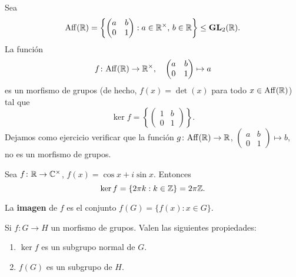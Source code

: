 

\begin{example}
\label{exa:afin}
Sea 
\[
\mathrm{Aff}(\mathbb{R})=\left\{\begin{pmatrix}a&b\\0&1\end{pmatrix}:a\in\mathbb{R}^\times,\,b\in\mathbb{R}\right\}\leq\mathbf{GL}_2(\mathbb{R}).
\]
La función 
\[
f\colon \mathrm{Aff}(\mathbb{R})\to\mathbb{R}^\times,\quad
\begin{pmatrix}
a&b\\
0&1
\end{pmatrix}
\mapsto a
\]
es un morfismo de grupos (de hecho, $f(x)=\det(x)$ para todo $x\in\mathrm{Aff}(\mathbb{R})$) tal que
\[
\ker f=\left\{\begin{pmatrix}
1&b\\
0&1
\end{pmatrix}
\right\}.
\]
Dejamos como ejercicio verificar que la función $g\colon\mathrm{Aff}(\mathbb{R})\to\mathbb{R}$, $\begin{pmatrix}a&b\\0&1\end{pmatrix}\mapsto b$, 
no es un morfismo de grupos. 
\end{example}

\begin{example}
Sea $f\colon\mathbb{R}\to\mathbb{C}^\times$, $f(x)=\cos x+i\sin x$. Entonces
\[
\ker f=\{2\pi k:k\in\mathbb{Z}\}=2\pi\mathbb{Z}.
\] 
\end{example}

\begin{definition}
La \textbf{imagen} de $f$ es 
el conjunto $f(G)=\{f(x):x\in G\}$. 
\end{definition}

\begin{proposition}
	Si  $f\colon G\to H$ un morfismo de grupos. Valen las siguientes propiedades:
	\begin{enumerate}
		\item $\ker f$ es un subgrupo normal de $G$.
		\item $f(G)$ es un subgrupo de $H$.
	\end{enumerate}
\end{proposition}

